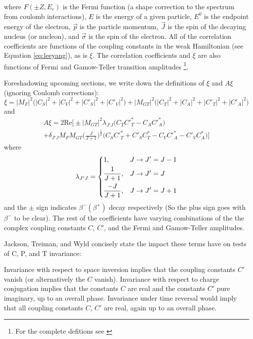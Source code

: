 %
where $F(\pm Z, E_e)$ is the Fermi function (a shape correction to the spectrum
from coulomb interactions), $E$ is the energy of a given particle, $E^0$ is the endpoint
energy of the electron, $\vec{p}$ is the particle momentum, $\vec{J}$ is the spin of the
decaying nucleus (or nucleon), and $\vec{\sigma}$ is the spin of the electron. All of the correlation coefficients
are functions of the coupling constants in the weak Hamiltonian (see Equation \ref{eq:leeyang}),
as is $\xi$. The correlation coefficients and $\xi$ are also functions of Fermi and Gamow-Teller
transition amplitudes \footnote{For the complete defitions see \cite{jackson1957a,jackson1957b,ebel1957}}.

Foreshadowing upcoming sections, we write down the definitions of $\xi$ and $A\xi$ (ignoring Coulomb
corrections):
%
\begin{equation}
  \xi = |M_F|^2\big(|C_S|^2+|C_V|^2+|C'_S|^2+|C'_V|^2\big)+|M_{GT}|^2\big(|C_T|^2+|C_A|^2+|C'_T|^2+|C'_A|^2\big)
  \label{eq:xi}
\end{equation}
%
and
\begin{multline}
  A\xi = 2\mathrm{Re}\bigg[\pm |M_{GT}|^2 \lambda_{J'J}\big(C_TC'^*_T-C_AC'^*_A \big) \\
    + \delta_{J'J}M_FM_{GT}\bigg( \frac{J}{J+1} \bigg)^{\frac{1}{2}}\big(C_SC'^*_T+C'_SC^*_T -C_VC'^*_A-C'_VC^*_A \big) \bigg]
  \label{eq:XiA}
\end{multline}
where
\begin{equation}
\lambda_{J'J} =
\begin{dcases}
  1, & J\rightarrow J'=J-1 \\
  \frac{1}{J+1}, &  J\rightarrow J'=J \\
  \frac{-J}{J+1}, &  J\rightarrow J'=J+1 \\
\end{dcases}
\end{equation}
and the $\pm$ sign indicates $\beta^-(\beta^+)$ decay respectively (So the plus sign goes with
$\beta^-$ to be clear).
The rest of the coefficients have varying combinations of the the complex coupling
constants $C$, $C'$, and the Fermi and
Gamow-Teller amplitudes.

Jackson, Treiman, and Wyld concisely state the impact these terms have on tests of C, P, and
T invariance:
\begin{displayquote}
Invariance with respect to space inversion implies that the coupling constants $C'$
vanish (or alternatively the $C$ vanish). Invariance with respect to charge
conjugation implies that the constants $C$ are real and the constants $C'$
pure imaginary, up to an overall phase. Invariance under time reversal
would imply that all coupling constants $C$, $C'$ are real, again up to an
overall phase.
\end{displayquote}

